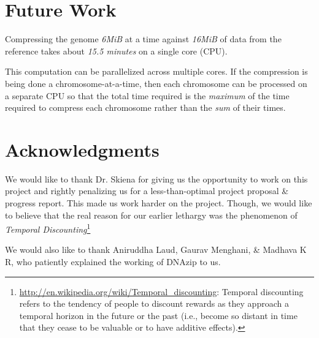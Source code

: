 \documentclass[11pt]{article}
\begin{document}
\section{Future Work}

Compressing the genome \textit{6MiB} at a time against \textit{16MiB} of
data from the reference takes about \textit{15.5 minutes} on a single
core (CPU).

This computation can be parallelized across multiple cores. If the
compression is being done a chromosome-at-a-time, then each chromosome
can be processed on a separate CPU so that the total time required is
the \textit{maximum} of the time required to compress each chromosome
rather than the \textit{sum} of their times.

\section{Acknowledgments}

We would like to thank Dr. Skiena for giving us the opportunity to
work on this project and rightly penalizing us for a less-than-optimal
project proposal \& progress report. This made us work harder on the
project. Though, we would like to believe that the real reason for our
earlier lethargy was the phenomenon of \textit{Temporal
  Discounting}\footnote{\url{http://en.wikipedia.org/wiki/Temporal_discounting}:
  Temporal discounting refers to the tendency of people to discount
  rewards as they approach a temporal horizon in the future or the
  past (i.e., become so distant in time that they cease to be valuable
  or to have additive effects).}

We would also like to thank Aniruddha Laud, Gaurav Menghani, \&
Madhava K R, who patiently explained the working of
DNAzip\cite{dnazip} to us.



\clearpage
\end{document}
